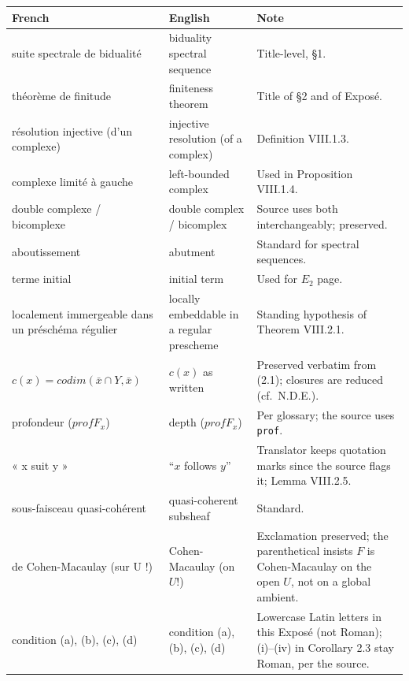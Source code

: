 \documentclass[
  11pt,
  a4paper,
]{book}
\newcounter{none} %
\begin{document}
{\def\LTcaptype{none} %
\begin{longtable}[]{@{}
  >{\raggedright\arraybackslash}p{}
  >{\raggedright\arraybackslash}p{}
  >{\raggedright\arraybackslash}p{}@{}}
\toprule\noalign{}
\begin{minipage}[b]{\linewidth}\raggedright
French
\end{minipage} & \begin{minipage}[b]{\linewidth}\raggedright
English
\end{minipage} & \begin{minipage}[b]{\linewidth}\raggedright
Note
\end{minipage} \\
\midrule\noalign{}
\endhead
\bottomrule\noalign{}
\endlastfoot
suite spectrale de bidualité & biduality spectral sequence &
Title-level, §1. \\
théorème de finitude & finiteness theorem & Title of §2 and of
Exposé. \\
résolution injective (d'un complexe) & injective resolution (of a
complex) & Definition VIII.1.3. \\
complexe limité à gauche & left-bounded complex & Used in Proposition
VIII.1.4. \\
double complexe / bicomplexe & double complex / bicomplex & Source uses
both interchangeably; preserved. \\
aboutissement & abutment & Standard for spectral sequences. \\
terme initial & initial term & Used for \(E_{2}\) page. \\
localement immergeable dans un préschéma régulier & locally embeddable
in a regular prescheme & Standing hypothesis of Theorem VIII.2.1. \\
\(c(x) = codim(\bar{x} \cap Y, \bar{x})\) & \(c(x)\) as written &
Preserved verbatim from (2.1); closures are reduced (cf.~N.D.E.). \\
profondeur (\(prof F_{x}\)) & depth (\(prof F_{x}\)) & Per glossary; the
source uses \texttt{prof}. \\
« x suit y » & ``\(x\) follows \(y\)'' & Translator keeps quotation
marks since the source flags it; Lemma VIII.2.5. \\
sous-faisceau quasi-cohérent & quasi-coherent subsheaf & Standard. \\
de Cohen-Macaulay (sur U !) & Cohen-Macaulay (on \(U\)!) & Exclamation
preserved; the parenthetical insists \(F\) is Cohen-Macaulay on the open
\(U\), not on a global ambient. \\
condition (a), (b), (c), (d) & condition (a), (b), (c), (d) & Lowercase
Latin letters in this Exposé (not Roman); (i)--(iv) in Corollary 2.3
stay Roman, per the source. \\
\end{longtable}
}
\end{document}
